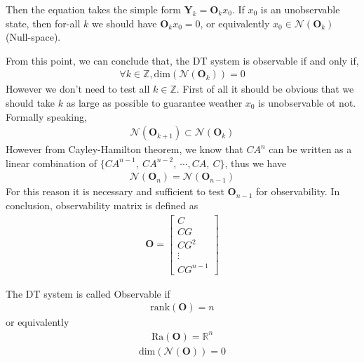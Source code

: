 \documentclass[twoside]{article}
\begin{document}
%
Then the equation takes the simple form $\mathbf{Y}_k = \mathbf{O}_k
x_0$. If $x_0$ is an unobservable state, then for-all $k$ we should have
$\mathbf{O}_k x_0 = 0$, or equivalently $x_0 \in \mathcal{N} \left(
  \mathbf{O}_k \right)$ (Null-space). 

From this point, we can conclude that, the DT system is observable if
and only if, 
%
\begin{align*}
  \forall k \in \mathbb{Z}, \mathrm{dim} \left( \mathcal{N} \left(
  \mathbf{O}_k \right) \right) = 0
\end{align*}
%
However we don't need to test all $k \in \mathbb{Z}$. First of all
it should be obvious that we should take $k$ as large as possible
to guarantee weather $x_0$ is unobservable ot not. Formally speaking,
%
\begin{align*}
 \mathcal{N} \left( \mathbf{O}_{k+1} \right) \subset \mathcal{N} \left( \mathbf{O}_{k} \right)
\end{align*}
%
However from Cayley-Hamilton theorem, we know that $C A^n$ can be
written as a linear combination of $\lbrace C A^{n-1} , \ C A^{n-2} ,
\ \cdots , C A , \ C\rbrace$, thus we have 
%
%
\begin{align*}
 \mathcal{N} \left( \mathbf{O}_{n} \right) = \mathcal{N} \left( \mathbf{O}_{n-1} \right)
\end{align*}
%
For this reason it is necessary and sufficient to test $\mathbf{O}_{n-1}$
for observability. In conclusion, observability matrix is defined as
%
\begin{align*}
  \mathbf{O} =
\left[ \begin{array}{c}
C 
\\
C G 
\\
C G^2 
\\
  \vdots
\\
C G^{n-1}
\end{array}
\right] 
\end{align*}

The DT system is called Observable if
%
\begin{align*}
  \mathrm{rank} \left( \mathbf{O} \right) = n
\end{align*}
%
or equivalently 
%
\begin{align*}
  \mathrm{Ra} \left( \mathbf{O} \right) = \mathbb{R}^n
\end{align*}
%
\begin{align*}
 \mathrm{dim} \left ( \mathcal{N} ( \mathbf{O} ) \right) = 0
\end{align*} 

\end{document}
